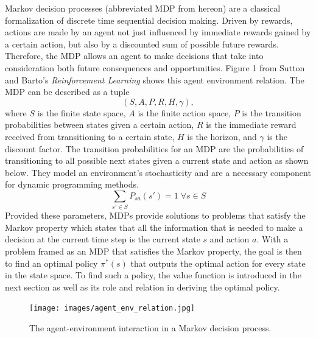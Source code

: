 \documentclass[fullpage]{article}
\begin{document}
Markov decision processes (abbreviated MDP from hereon) are a classical formalization of discrete time sequential decision making. Driven by rewards, actions are made by an agent not just influenced by immediate rewards gained by a certain action, but also by a discounted sum of possible future rewards. Therefore, the MDP allows an agent to make decisions that take into consideration both future consequences and opportunities. Figure 1 from Sutton and Barto's \textit{Reinforcement Learning} shows this agent environment relation. The MDP can be described as a tuple
\[
(S, A, P, R, H, \gamma),
\]
where $S$ is the finite state space, $A$ is the finite action space, $P$ is the transition probabilities between states given a certain action, $R$ is the immediate reward received from transitioning to a certain state, $H$ is the horizon, and $\gamma$ is the discount factor. The transition probabilities for an MDP are the probabilities of transitioning to all possible next states given a current state and action as shown below. They model an environment's stochasticity and are a necessary component for dynamic programming methods.
\[
\sum_{s' \in S} P_{sa}(s') = 1 \; \forall s \in S
\]
Provided these parameters, MDPs provide solutions to problems that satisfy the Markov property which states that all the information that is needed to make a decision at the current time step is the current state $s$ and action $a$. With a problem framed as an MDP that satisfies the Markov property, the goal is then to find an optimal policy $\pi^*(s)$ that outputs the optimal action for every state in the state space. To find such a policy, the value function is introduced in the next section as well as its role and relation in deriving the optimal policy.  

\begin{figure}[H]
\centering
\texttt{[image: images/agent\_env\_relation.jpg]}
\caption{The agent-environment interaction in a Markov decision process.}
\label{fig:gridworld}
\end{figure}
\end{document}
